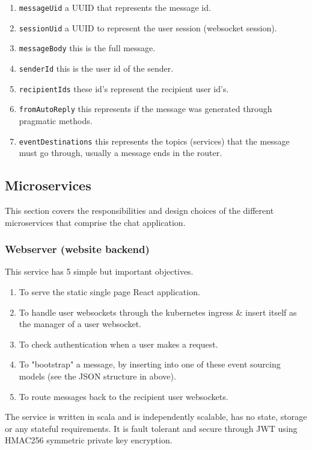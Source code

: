 \begin{enumerate}
    \item \texttt{messageUid} a UUID that represents the message id.
    \item \texttt{sessionUid} a UUID to represent the user session (websocket session).
    \item \texttt{messageBody} this is the full message.
    \item \texttt{senderId} this is the user id of the sender.
    \item \texttt{recipientIds} these id's represent the recipient user id's.
    \item \texttt{fromAutoReply} this represents if the message was generated through pragmatic methods.
    \item \texttt{eventDestinations} this represents the topics (services) that the message must go through, usually a message ends in the router.
\end{enumerate}

\subsection{Microservices}
This section covers the responsibilities and design choices of the different microservices that comprise the chat application.

\subsubsection{Webserver (website backend)}
This service has 5 simple but important objectives.
\begin{enumerate}
    \item To serve the static single page React application.
    \item To handle user websockets through the kubernetes ingress \& insert itself as the manager of a user websocket.
    \item To check authentication when a user makes a request.
    \item To "bootstrap" a message, by inserting into one of these event sourcing models (see the JSON structure in above).
    \item To route messages back to the recipient user websockets.
\end{enumerate}
The service is written in scala and is independently scalable, has no state, storage or any stateful requirements.
It is fault tolerant and secure through JWT using HMAC256 symmetric private key encryption.

